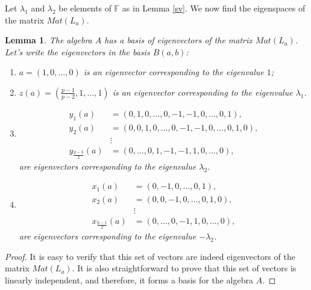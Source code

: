 \documentclass[12pt]{article}
\newcommand\F{\mathbb{F}}
\newcommand\lm{\lambda}
\newtheorem{lem}{Lemma}
\begin{document}
Let $\lm_1$ and $\lm_2$ be elements of $\F$ as in Lemma \ref{sv}.
We now find the eigenspaces of the matrix $Mat(L_{a})$.
\begin{lem}\label{basis2}
	The algebra $A$ has a basis of eigenvectors of the matrix $Mat(L_a)$. Let's write the eigenvectors in the basis $B(a,b)$:
	\begin{enumerate}
		\item $a = (1,0,\dots,0)$ is an eigenvector corresponding to the eigenvalue $1$;
		
		\item $z(a) = \left(\frac{p-1}{p-2}, 1, \dots, 1\right)$ is an eigenvector corresponding to the eigenvalue $\lambda_1$.
		
		\item  
		\begin{align*}
			y_1(a) &= (0, 1, 0, \dots, 0, -1, -1, 0, \dots, 0, 1), \\
			y_2(a) &= (0, 0, 1, 0, \dots,0, -1, -1, 0, \dots,0, 1, 0), \\
			&\vdots \\
			y_{\frac{p-3}{2}}(a) &= (0, \dots,0, 1, -1, -1, 1, 0, \dots, 0),
		\end{align*}
		are eigenvectors corresponding to the eigenvalue $\lambda_2$.
		
		\item \begin{align*}
			x_1(a) &= (0, -1,0, \dots,0, 1), \\
			x_2(a) &= (0, 0, -1,0, \dots,0, 1, 0), \\
			&\vdots \\
			x_{\frac{p-1}{2}}(a) &= (0, \dots, 0, -1, 1, 0, \dots, 0),
		\end{align*}
		are eigenvectors corresponding to the eigenvalue $-\lambda_2$.
	\end{enumerate}
\end{lem}

\begin{proof}
	It is easy to verify that this set of vectors are indeed eigenvectors of the matrix $Mat(L_a)$. It is also straightforward to prove that this set of vectors is linearly independent, and therefore, it forms a basis for the algebra $A$.
\end{proof}
\end{document}
